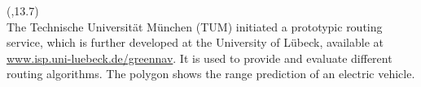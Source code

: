 \begin{textblock}{\mycolwidth}(\leftpos,13.7)
 \\
\large
The Technische Universit\"at M\"unchen (TUM) initiated a prototypic routing service,
which is further developed at the University of L\"ubeck,
available at \url{www.isp.uni-luebeck.de/greennav}. It is used
to provide and evaluate different routing algorithms. The polygon shows the range prediction of an electric vehicle.
\begin{center}
\end{center}
\end{textblock}
